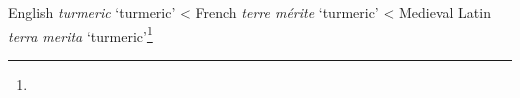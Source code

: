 \begin{etymology}\label{ety:turmeric}
English \textit{turmeric} `turmeric'
< French \textit{terre mérite} `turmeric'
< Medieval Latin \textit{terra merita} `turmeric'\footnote{}
\end{etymology}